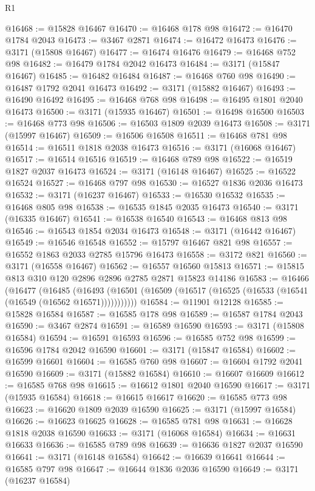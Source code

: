 \begin{lexlean}{R1}
\begin{coremodule}
@16468 := @15828 @16467
@16470 := @16468 @178 @98
@16472 := @16470 @1784 @2043
@16473 := @3467 @2871
@16474 := @16472 @16473
@16476 := @3171 (@15808 @16467)
@16477 := @16474 @16476
@16479 := @16468 @752 @98
@16482 := @16479 @1784 @2042 @16473
@16484 := @3171 (@15847 @16467)
@16485 := @16482 @16484
@16487 := @16468 @760 @98
@16490 := @16487 @1792 @2041 @16473
@16492 := @3171 (@15882 @16467)
@16493 := @16490 @16492
@16495 := @16468 @768 @98
@16498 := @16495 @1801 @2040 @16473
@16500 := @3171 (@15935 @16467)
@16501 := @16498 @16500
@16503 := @16468 @773 @98
@16506 := @16503 @1809 @2039 @16473
@16508 := @3171 (@15997 @16467)
@16509 := @16506 @16508
@16511 := @16468 @781 @98
@16514 := @16511 @1818 @2038 @16473
@16516 := @3171 (@16068 @16467)
@16517 := @16514 @16516
@16519 := @16468 @789 @98
@16522 := @16519 @1827 @2037 @16473
@16524 := @3171 (@16148 @16467)
@16525 := @16522 @16524
@16527 := @16468 @797 @98
@16530 := @16527 @1836 @2036 @16473
@16532 := @3171 (@16237 @16467)
@16533 := @16530 @16532
@16535 := @16468 @805 @98
@16538 := @16535 @1845 @2035 @16473
@16540 := @3171 (@16335 @16467)
@16541 := @16538 @16540
@16543 := @16468 @813 @98
@16546 := @16543 @1854 @2034 @16473
@16548 := @3171 (@16442 @16467)
@16549 := @16546 @16548
@16552 := @15797 @16467 @821 @98
@16557 := @16552 @1863 @2033 @2785 @15796 @16473
@16558 := @3172 @821
@16560 := @3171 (@16558 @16467)
@16562 := @16557 @16560 @15813
@16571 := @15815 @813 @310 @120 @2896 @2896 @2785 @2871 @15823 @14186
@16583 := @16466
    (@16477
      (@16485
        (@16493 (@16501 (@16509 (@16517 (@16525 (@16533 (@16541 (@16549 (@16562 @16571)))))))))))
@16584 := @11901 @12128
@16585 := @15828 @16584
@16587 := @16585 @178 @98
@16589 := @16587 @1784 @2043
@16590 := @3467 @2874
@16591 := @16589 @16590
@16593 := @3171 (@15808 @16584)
@16594 := @16591 @16593
@16596 := @16585 @752 @98
@16599 := @16596 @1784 @2042 @16590
@16601 := @3171 (@15847 @16584)
@16602 := @16599 @16601
@16604 := @16585 @760 @98
@16607 := @16604 @1792 @2041 @16590
@16609 := @3171 (@15882 @16584)
@16610 := @16607 @16609
@16612 := @16585 @768 @98
@16615 := @16612 @1801 @2040 @16590
@16617 := @3171 (@15935 @16584)
@16618 := @16615 @16617
@16620 := @16585 @773 @98
@16623 := @16620 @1809 @2039 @16590
@16625 := @3171 (@15997 @16584)
@16626 := @16623 @16625
@16628 := @16585 @781 @98
@16631 := @16628 @1818 @2038 @16590
@16633 := @3171 (@16068 @16584)
@16634 := @16631 @16633
@16636 := @16585 @789 @98
@16639 := @16636 @1827 @2037 @16590
@16641 := @3171 (@16148 @16584)
@16642 := @16639 @16641
@16644 := @16585 @797 @98
@16647 := @16644 @1836 @2036 @16590
@16649 := @3171 (@16237 @16584)

\end{coremodule}
\end{lexlean}
